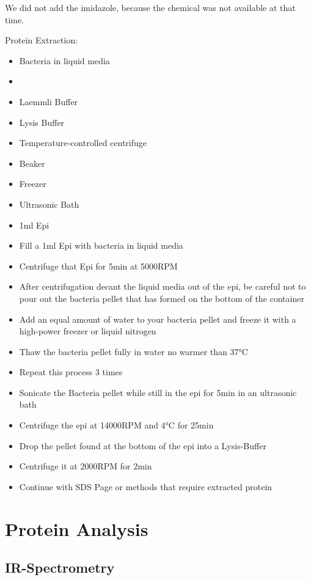 We did not add the imidazole, because the chemical was not available at that time.

Protein Extraction:

\begin{itemize}
    \item Bacteria in liquid media
    \item {}
    \item Laemmli Buffer
    \item Lysis Buffer
    \item Temperature-controlled centrifuge
    \item Beaker
    \item Freezer
    \item Ultrasonic Bath
    \item 1ml Epi
    \item Fill a 1ml Epi with bacteria in liquid media
    \item Centrifuge that Epi for 5min at 5000RPM
    \item After centrifugation decant the liquid media out of the epi, be careful not to pour out the
    bacteria pellet that has formed on the bottom of the container
    \item Add an equal amount of water to your bacteria pellet and freeze it with a high-power freezer
    or liquid nitrogen
    \item Thaw the bacteria pellet fully in water no warmer than 37°C
    \item Repeat this process 3 times
    \item Sonicate the Bacteria pellet while still in the epi for 5min in an ultrasonic bath
    \item Centrifuge the epi at 14000RPM and 4°C for 25min
    \item Drop the pellet found at the bottom of the epi into a Lysis-Buffer
    \item Centrifuge it at 2000RPM for 2min
    \item Continue with SDS Page or methods that require extracted protein
\end{itemize}



\section{Protein Analysis\authorA}

\subsection{IR-Spectrometry}

